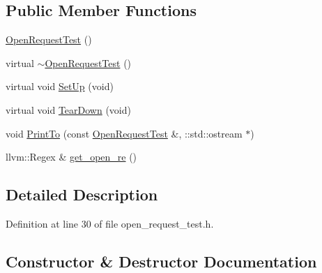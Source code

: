 \subsection*{Public Member Functions}
\begin{DoxyCompactItemize}
\item 
\hyperlink{classclang_1_1tidy_1_1pagesjaunes_1_1test_1_1_open_request_test_abebf82dff6d2c33d7bb0da8be9562c73}{Open\+Request\+Test} ()
\item 
virtual \hyperlink{classclang_1_1tidy_1_1pagesjaunes_1_1test_1_1_open_request_test_acc749bcde7c0b29e3c0d8cab1a598e61}{$\sim$\+Open\+Request\+Test} ()
\item 
virtual void \hyperlink{classclang_1_1tidy_1_1pagesjaunes_1_1test_1_1_open_request_test_a45a010812dff31c9170dd04adfda2202}{Set\+Up} (void)
\item 
virtual void \hyperlink{classclang_1_1tidy_1_1pagesjaunes_1_1test_1_1_open_request_test_a5c9237258553286289ddc7e71016a60f}{Tear\+Down} (void)
\item 
void \hyperlink{classclang_1_1tidy_1_1pagesjaunes_1_1test_1_1_open_request_test_a81ae58d7fd7840265787de397c93dafa}{Print\+To} (const \hyperlink{classclang_1_1tidy_1_1pagesjaunes_1_1test_1_1_open_request_test}{Open\+Request\+Test} \&, \+::std\+::ostream $\ast$)
\item 
llvm\+::\+Regex \& \hyperlink{classclang_1_1tidy_1_1pagesjaunes_1_1test_1_1_open_request_test_aa7e59570c4aa74d662437f71ee0ca2d4}{get\+\_\+open\+\_\+re} ()
\end{DoxyCompactItemize}


\subsection{Detailed Description}


Definition at line 30 of file open\+\_\+request\+\_\+test.\+h.



\subsection{Constructor \& Destructor Documentation}
\mbox{\label{classclang_1_1tidy_1_1pagesjaunes_1_1test_1_1_open_request_test_abebf82dff6d2c33d7bb0da8be9562c73}} 
